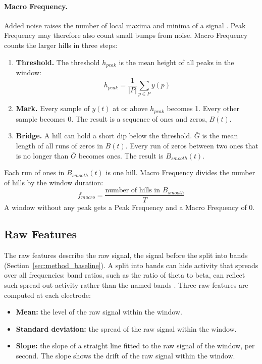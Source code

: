 \documentclass[12pt,a4paper]{report}
\begin{document}
\paragraph{Macro Frequency.} Added noise raises the number of local maxima and minima of a signal \cite{niknazar_new_2018}. Peak Frequency may therefore also count small bumps from noise. Macro Frequency counts the larger hills in three steps:
\begin{enumerate}
    \item \textbf{Threshold.} The threshold \(h_{peak}\) is the mean height of all peaks in the window:
    \begin{equation}
        h_{peak} = \frac{1}{|P|} \sum_{p \in P} y(p)
    \end{equation}
    \item \textbf{Mark.} Every sample of \(y(t)\) at or above \(h_{peak}\) becomes 1. Every other sample becomes 0. The result is a sequence of ones and zeros, \(B(t)\).
    \item \textbf{Bridge.} A hill can hold a short dip below the threshold. \(\bar{G}\) is the mean length of all runs of zeros in \(B(t)\). Every run of zeros between two ones that is no longer than \(\bar{G}\) becomes ones. The result is \(B_{smooth}(t)\).
\end{enumerate}
Each run of ones in \(B_{smooth}(t)\) is one hill. Macro Frequency divides the number of hills by the window duration:
\begin{equation}
    f_{macro} = \frac{\text{number of hills in } B_{smooth}}{T}
\end{equation}
A window without any peak gets a Peak Frequency and a Macro Frequency of 0.

\subsection{Raw Features}
\label{sec:method_raw_features}
The raw features describe the raw signal, the signal before the split into bands (Section~\ref{sec:method_baseline}). A split into bands can hide activity that spreads over all frequencies: band ratios, such as the ratio of theta to beta, can reflect such spread-out activity rather than the named bands \cite{donoghue_electrophysiological_2020}. Three raw features are computed at each electrode:
\begin{itemize}
    \item \textbf{Mean:} the level of the raw signal within the window.
    \item \textbf{Standard deviation:} the spread of the raw signal within the window.
    \item \textbf{Slope:} the slope of a straight line fitted to the raw signal of the window, per second. The slope shows the drift of the raw signal within the window.
\end{itemize}
\end{document}
